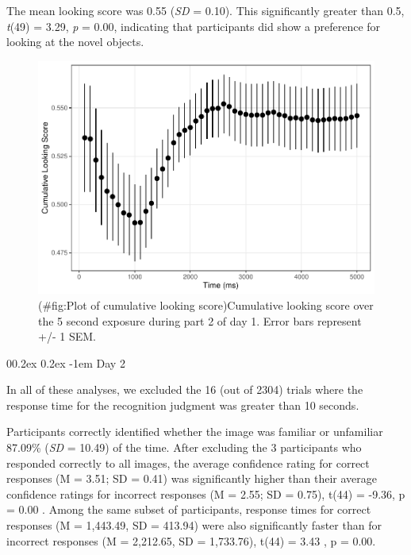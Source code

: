 \documentclass[
  man,floatsintext]{apa6}
\makeatletter
\let\oldparagraph\paragraph
\renewcommand{\paragraph}[1]{\oldparagraph{#1}\mbox{}}
\renewcommand{\paragraph}{\@startsection{paragraph}{4}{\parindent}%
  {0\baselineskip \@plus 0.2ex \@minus 0.2ex}%
  {-1em}%
  {\normalfont\normalsize\bfseries\itshape\typesectitle}}
\makeatother
\begin{document}
The mean looking score was 0.55 (\emph{SD} = 0.10). This significantly greater than 0.5, \emph{t}(49) = 3.29, \emph{p} = 0.00, indicating that participants did show a preference for looking at the novel objects.

\begin{figure}
\centering
\includegraphics{manuscript_files/figure-latex/Plot of cumulative looking score-1.pdf}
\caption{(\#fig:Plot of cumulative looking score)Cumulative looking score over the 5 second exposure during part 2 of day 1. Error bars represent +/- 1 SEM.}
\end{figure}

\hypertarget{day-2}{%
\paragraph{Day 2}\label{day-2}}

In all of these analyses, we excluded the 16 (out of 2304) trials where the response time for the recognition judgment was greater than 10 seconds.

Participants correctly identified whether the image was familiar or unfamiliar 87.09\% (\emph{SD} = 10.49) of the time. After excluding the 3 participants who responded correctly to all images, the average confidence rating for correct responses (M = 3.51; SD = 0.41) was significantly higher than their average confidence ratings for incorrect responses (M = 2.55; SD = 0.75), t(44) = -9.36, p = 0.00 . Among the same subset of participants, response times for correct responses (M = 1,443.49, SD = 413.94) were also significantly faster than for incorrect responses (M = 2,212.65, SD = 1,733.76), t(44) = 3.43 , p = 0.00.
\end{document}
